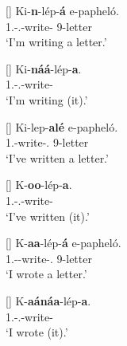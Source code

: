 \documentclass[output=paper]{langscibook}
\begin{document}
\ea
\label{cjdjprs}
\begin{xlist}
\exi{\CJ}
[]{
\gll
Ki-\textbf{n}-lép-\textbf{á} e-papheló.\\
1\SG{}.\SM{}-\PRS{}.\CJ{}-write-\FV{}  9-letter\\
\glt
‘I’m writing a letter.’\\
}

\exi{\DJ}
[]{
\gll
Ki-\textbf{náá}-lép-\textbf{a}.\\
1\SG{}.\SM{}-\PRS{}.\DJ{}-write-\FV{}\\
\glt
‘I’m writing (it).’\\
}

\end{xlist}
\z

\ea
\label{cjdjpfv}
\begin{xlist}
\exi{\CJ}
[]{
\gll
Ki-lep-\textbf{alé} e-papheló.\\
1\SG{}.\SM{}-write-\PFV{}.\CJ{}  9-letter\\
\glt
‘I’ve written a letter.’\\
}

\exi{\DJ}
[]{
\gll
K-\textbf{oo}-lép-\textbf{a}.\\
1\SG{}.\SM{}-\PFV{}.\DJ{}-write-\FV{}\\
\glt
‘I’ve written (it).’\\
}
\end{xlist}
\z

\ea
\label{cjdjipfv}
\begin{xlist}
\exi{\CJ}
[]{
\gll
K-\textbf{aa}-lép-\textbf{á} e-papheló.\\
1\SG{}.\SM{}-\IPFV{}-write-\FV{}.\CJ{}  9-letter\\
\glt
‘I wrote a letter.’\\
}

\exi{\DJ}
[]{
\gll
K-\textbf{aánáa}-lép-\textbf{a}.\\
1\SG{}.\SM{}-\IPFV{}.\DJ{}-write-\FV{}\\
\glt
‘I wrote (it).’\\
}

\end{xlist}
\z
\end{document}
